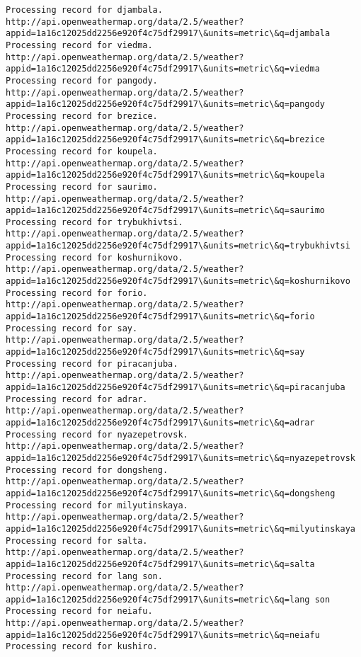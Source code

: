 \documentclass[11pt]{article}
\begin{document}
\begin{Verbatim}[commandchars=\\\{\}]
Processing record for djambala.
http://api.openweathermap.org/data/2.5/weather?appid=1a16c12025dd2256e920f4c75df29917\&units=metric\&q=djambala
Processing record for viedma.
http://api.openweathermap.org/data/2.5/weather?appid=1a16c12025dd2256e920f4c75df29917\&units=metric\&q=viedma
Processing record for pangody.
http://api.openweathermap.org/data/2.5/weather?appid=1a16c12025dd2256e920f4c75df29917\&units=metric\&q=pangody
Processing record for brezice.
http://api.openweathermap.org/data/2.5/weather?appid=1a16c12025dd2256e920f4c75df29917\&units=metric\&q=brezice
Processing record for koupela.
http://api.openweathermap.org/data/2.5/weather?appid=1a16c12025dd2256e920f4c75df29917\&units=metric\&q=koupela
Processing record for saurimo.
http://api.openweathermap.org/data/2.5/weather?appid=1a16c12025dd2256e920f4c75df29917\&units=metric\&q=saurimo
Processing record for trybukhivtsi.
http://api.openweathermap.org/data/2.5/weather?appid=1a16c12025dd2256e920f4c75df29917\&units=metric\&q=trybukhivtsi
Processing record for koshurnikovo.
http://api.openweathermap.org/data/2.5/weather?appid=1a16c12025dd2256e920f4c75df29917\&units=metric\&q=koshurnikovo
Processing record for forio.
http://api.openweathermap.org/data/2.5/weather?appid=1a16c12025dd2256e920f4c75df29917\&units=metric\&q=forio
Processing record for say.
http://api.openweathermap.org/data/2.5/weather?appid=1a16c12025dd2256e920f4c75df29917\&units=metric\&q=say
Processing record for piracanjuba.
http://api.openweathermap.org/data/2.5/weather?appid=1a16c12025dd2256e920f4c75df29917\&units=metric\&q=piracanjuba
Processing record for adrar.
http://api.openweathermap.org/data/2.5/weather?appid=1a16c12025dd2256e920f4c75df29917\&units=metric\&q=adrar
Processing record for nyazepetrovsk.
http://api.openweathermap.org/data/2.5/weather?appid=1a16c12025dd2256e920f4c75df29917\&units=metric\&q=nyazepetrovsk
Processing record for dongsheng.
http://api.openweathermap.org/data/2.5/weather?appid=1a16c12025dd2256e920f4c75df29917\&units=metric\&q=dongsheng
Processing record for milyutinskaya.
http://api.openweathermap.org/data/2.5/weather?appid=1a16c12025dd2256e920f4c75df29917\&units=metric\&q=milyutinskaya
Processing record for salta.
http://api.openweathermap.org/data/2.5/weather?appid=1a16c12025dd2256e920f4c75df29917\&units=metric\&q=salta
Processing record for lang son.
http://api.openweathermap.org/data/2.5/weather?appid=1a16c12025dd2256e920f4c75df29917\&units=metric\&q=lang son
Processing record for neiafu.
http://api.openweathermap.org/data/2.5/weather?appid=1a16c12025dd2256e920f4c75df29917\&units=metric\&q=neiafu
Processing record for kushiro.

\end{Verbatim}
\end{document}

